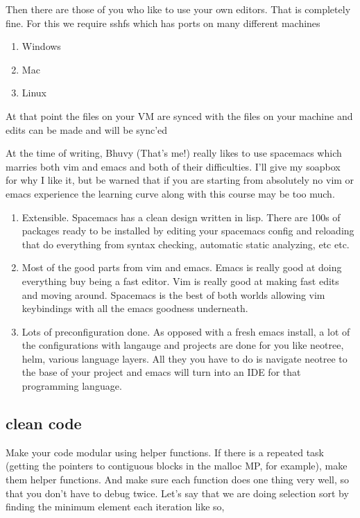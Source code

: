 Then there are those of you who like to use your own editors. That is completely fine.
For this we require sshfs which has ports on many different machines
\begin{enumerate}
\item Windows 
\item Mac 
\item Linux 
\end{enumerate}
At that point the files on your VM are synced with the files on your machine and edits can be made and will be sync'ed

At the time of writing, Bhuvy (That's me!) really likes to use spacemacs  which marries both vim and emacs and both of their difficulties. I'll give my soapbox for why I like it, but be warned that if you are starting from absolutely no vim or emacs experience the learning curve along with this course may be too much.
\begin{enumerate}
\item Extensible. Spacemacs has a clean design written in lisp. There are 100s of packages ready to be installed by editing your spacemacs config and reloading that do everything from syntax checking, automatic static analyzing, etc etc.
\item Most of the good parts from vim and emacs. Emacs is really good at doing everything buy being a fast editor. Vim is really good at making fast edits and moving around. Spacemacs is the best of both worlds allowing vim keybindings with all the emacs goodness underneath.
\item Lots of preconfiguration done. As opposed with a fresh emacs install, a lot of the configurations with langauge and projects are done for you like neotree, helm, various language layers. All they you have to do is navigate neotree to the base of your project and emacs will turn into an IDE for that programming language.
\end{enumerate}

\subsection{clean code}

Make your code modular using helper functions. If there is a repeated task (getting the pointers to contiguous blocks in the malloc MP, for example), make them helper functions. And make sure each function does one thing very well, so that you don't have to debug twice.
Let's say that we are doing selection sort by finding the minimum element each iteration like so,


